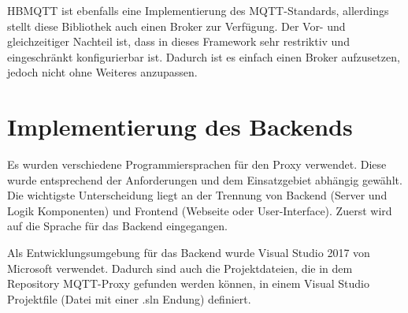     HBMQTT ist ebenfalls eine Implementierung des \ac{MQTT}-Standards, allerdings stellt diese Bibliothek auch einen Broker zur Verfügung. Der Vor- und gleichzeitiger Nachteil ist, dass in dieses Framework sehr restriktiv und eingeschränkt konfigurierbar ist. Dadurch ist es einfach einen Broker aufzusetzen, jedoch nicht ohne Weiteres anzupassen.
    \cite{jouanin_2018}
    
\section{Implementierung des Backends}

    Es wurden verschiedene Programmiersprachen für den Proxy verwendet. Diese wurde entsprechend der Anforderungen und dem Einsatzgebiet abhängig gewählt.
    Die wichtigste Unterscheidung liegt an der Trennung von Backend (Server und Logik Komponenten) und Frontend (Webseite oder User-Interface).
    Zuerst wird auf die Sprache für das Backend eingegangen.
    
    Als Entwicklungsumgebung für das Backend wurde Visual Studio 2017 \cite{microsoft_2019} von Microsoft verwendet. Dadurch sind auch die Projektdateien, die in dem Repository \glqq MQTT-Proxy\grqq{} \cite{eisenschmidt_2019} gefunden werden können, in einem Visual Studio Projektfile (Datei mit einer .sln Endung) definiert.
    
